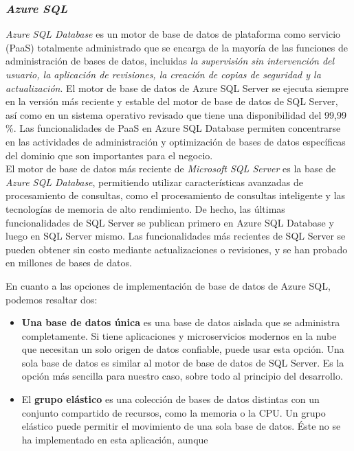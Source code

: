 \subsubsection{\textit{Azure SQL}}
\cite{AzureSQL}
\textit{Azure SQL Database} es un motor de base de datos de plataforma como servicio
(PaaS) totalmente administrado que se encarga de la mayoría de las funciones de
administración de bases de datos, incluidas \textit{la supervisión sin intervención del
usuario, la aplicación de revisiones, la creación de copias de seguridad y la
actualización}. El motor de base de datos de Azure SQL Server se ejecuta siempre
en la versión más reciente y estable del motor de base de datos de SQL Server,
así como en un sistema operativo revisado que tiene una disponibilidad del 99,99
\%. Las funcionalidades de PaaS en Azure SQL Database permiten concentrarse en
las actividades de administración y optimización de bases de datos específicas
del dominio que son importantes para el negocio.\\

El motor de base de datos más reciente de \textit{Microsoft SQL Server} es la base de
\textit{Azure SQL Database}, permitiendo utilizar características avanzadas de procesamiento de
consultas, como el procesamiento de consultas inteligente y las tecnologías de
memoria de alto rendimiento. De hecho, las últimas funcionalidades de SQL Server
se publican primero en Azure SQL Database y luego en SQL Server mismo. Las
funcionalidades más recientes de SQL Server se pueden obtener sin costo mediante
actualizaciones o revisiones, y se han probado en millones de bases de datos.


En cuanto a las opciones de implementación de base de datos de Azure SQL, podemos resaltar dos:
\begin{itemize}
    \item \textbf{Una base de datos única} es una base de datos aislada que se
    administra completamente. Si tiene aplicaciones y microservicios modernos en
    la nube que necesitan un solo origen de datos confiable, puede usar esta
    opción. Una sola base de datos es similar al motor de base de datos de SQL
    Server. Es la opción más sencilla para nuestro caso, sobre todo al principio
    del desarrollo.
    \item El \textbf{grupo elástico} es una colección de bases de datos distintas con un
    conjunto compartido de recursos, como la memoria o la CPU. Un grupo elástico
    puede permitir el movimiento de una sola base de datos. Éste no se ha implementado en esta aplicación, aunque 
\end{itemize}

